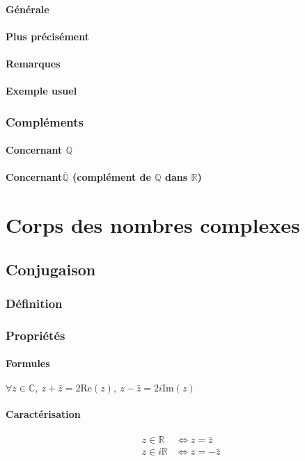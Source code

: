 \documentclass[12pt,a4paper,french]{book}
\begin{document}
			\subsubsection{Générale}
			\subsubsection{Plus précisément}
			\subsubsection{Remarques}
			\subsubsection{Exemple usuel}
		\subsection{Compléments}
			\subsubsection{Concernant $\mathbb{Q}$}
			\subsubsection{Concernant$\bar{\mathbb{Q}}$ (complément de $\mathbb{Q}$ dans $\mathbb{R}$)}
			
			
\chapter{Corps des nombres complexes}
	\section{Conjugaison}
		\subsection{Définition}
		\subsection{Propriétés}
			\subsubsection{Formules}
			$\forall z \in \mathbb{C}, \ z+ \bar{z} = 2\mbox{Re}(z), \ z - \bar{z} = 2i\mbox{Im}(z)$
		
			\subsubsection{Caractérisation}
				\begin{equation} \begin{split}
						z \in \mathbb{R} &\Leftrightarrow z = \bar{z} \\
						z \in i\mathbb{R} &\Leftrightarrow z = -\bar{z}
					\end{split}
				\end{equation} 
\end{document}
